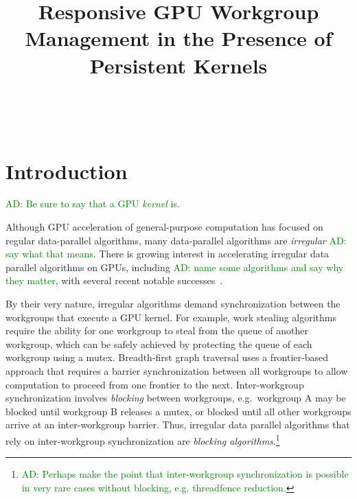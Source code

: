 \documentclass[nocopyrightspace]{sigplanconf-pldi16}
\newcommand{\ADComment}[1]{\textcolor{green}{AD: #1}}
\begin{document}
\title{Responsive GPU Workgroup Management in the Presence of
  Persistent Kernels}

%
%

\authorinfo{}
{\makebox{} \\
}
{}




\maketitle

\begin{abstract}


\end{abstract}
    
\section{Introduction}\label{sec:intro}

\ADComment{Be sure to say that a GPU \emph{kernel} is.}

Although GPU acceleration of general-purpose computation has focused
on regular data-parallel algorithms, many data-parallel algorithms are
\emph{irregular} \ADComment{say what that means}.  There is growing
interest in accelerating irregular data parallel algorithms on GPUs,
including \ADComment{name some algorithms and say why they matter},
with several recent notable successes~\cite{...}.

By their very nature, irregular algorithms demand synchronization
between the workgroups that execute a GPU kernel.  For example, work
stealing algorithms require the ability for one workgroup to steal
from the queue of another workgroup, which can be safely achieved by
protecting the queue of each workgroup using a mutex.  Breadth-first
graph traversal uses a frontier-based approach that requires a barrier
synchronization between all workgroups to allow computation to proceed
from one frontier to the next.  Inter-workgroup synchronization
involves \emph{blocking} between workgroups, e.g.\ workgroup A may be
blocked until workgroup B releases a mutex, or blocked until all other
workgroups arrive at an inter-workgroup barrier.  Thus, irregular data
parallel algorithms that rely on inter-workgroup synchronization are
\emph{blocking algorithms}.\footnote{\ADComment{Perhaps make the point
    that inter-workgroup synchronization is possible in very rare
    cases without blocking, e.g. threadfence reduction.}}
\end{document}

